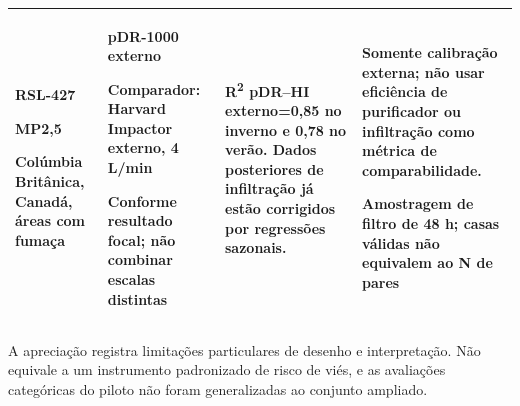 \begin{longtable}{|P{0.18\textwidth}|P{0.25\textwidth}|P{0.28\textwidth}|P{\arrayrulewidth\relax}|}
\textbf{RSL-427}\par\textcite{rsl427}\par MP2,5\par Colúmbia Britânica, Canadá, áreas com fumaça & pDR-1000 externo\par\medskip Comparador: Harvard Impactor externo, 4 L/min\par\medskip Conforme resultado focal; não combinar escalas distintas & R\textsuperscript{2} pDR--HI externo=0,85 no inverno e 0,78 no verão. Dados posteriores de infiltração já estão corrigidos por regressões sazonais. & Somente calibração externa; não usar eficiência de purificador ou infiltração como métrica de comparabilidade.\par\medskip Amostragem de filtro de 48 h; casas válidas não equivalem ao N de pares\\\hline
\end{longtable}
\endgroup

A apreciação registra limitações particulares de desenho e interpretação. Não equivale a um instrumento padronizado de risco de viés, e as avaliações categóricas do piloto não foram generalizadas ao conjunto ampliado.

